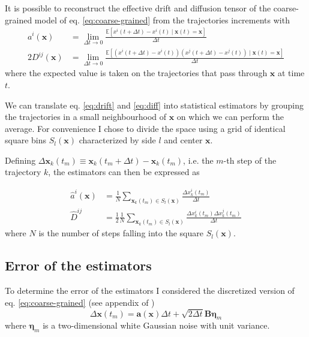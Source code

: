 \documentclass[a4paper]{article}
\begin{document}
It is possible to reconstruct the effective drift and diffusion tensor of the coarse-grained model of eq. \ref{eq:coarse-grained} from the trajectories increments \cite{hoze2014} \cite{schuss} with
\begin{align}
a^i(\bm{x}) &= \lim_{\Delta t \to 0}\frac{\mathbb{E}\left[x^i(t + \Delta t) - x^i(t) \mid \bm{x}(t) = \bm{x}\right]}{\Delta t} \label{eq:drift}\\[10pt]
2D^{ij}(\bm{x}) &= \lim_{\Delta t \to 0}\frac{\mathbb{E}\left[\left(x^i(t + \Delta t) - x^i(t)\right)\left(x^j(t + \Delta t) - x^j(t)\right) \mid \bm{x}(t) = \bm{x}\right]}{\Delta t} \label{eq:diff}
\end{align}
where the expected value is taken on the trajectories that pass through $\bm{x}$ at time $t$.

We can translate eq. \ref{eq:drift} and \ref{eq:diff} into statistical estimators by grouping the trajectories in a small neighbourhood of $\bm{x}$ on which we can perform the average. For convenience I chose to divide the space using a grid of identical square bins $S_l(\bm{x})$ characterized by side $l$ and center $\bm{x}$.

Defining $\Delta \bm{x}_k(t_m) \equiv \bm{x}_k(t_m + \Delta t) - \bm{x}_k(t_m)$, i.e. the $m$-th step of the trajectory $k$, the estimators can then be expressed as

\begin{align}
\hat{a}^i({\bm{x}}) &= \frac{1}{N} \sum_{\bm{x}_k(t_m) \in S_l(\bm{x})} \frac{\Delta x_k^i(t_m)}{\Delta t} \label{eq:drift-estimator} \\[10pt]
\hat{D}^{ij} &= \frac{1}{2} \frac{1}{N} \sum_{\bm{x}_k(t_m) \in S_l(\bm{x})}\frac{\Delta x_k^i(t_m) \Delta x_k^j(t_m)}{\Delta t} \label{eq:diff-estimator}
\end{align}
where $N$ is the number of steps falling into the square $S_l(\bm{x})$.

\subsection{Error of the estimators}

To determine the error of the estimators I considered the discretized version of eq. \ref{eq:coarse-grained} (see appendix of \cite{hoze2012})
\begin{equation}
\Delta \bm{x}(t_m) = \bm{a}(\bm{x}) \Delta t + \sqrt{2 \Delta t} \bm{B} \bm{\eta}_m
\end{equation}
where $\bm{\eta}_m$ is a two-dimensional white Gaussian noise with unit variance.
\end{document}
